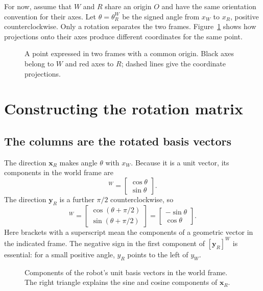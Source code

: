 For now, assume that $W$ and $R$ share an origin $O$ and have the same
orientation convention for their axes. Let $\theta=\theta_R^W$ be the signed
angle from $x_W$ to $x_R$, positive counterclockwise. Only a rotation separates
the two frames. Figure~\ref{fig:l02-coordinates} shows how projections onto
their axes produce different coordinates for the same point.

\begin{figure}[htbp]
\centering
\caption{A point expressed in two frames with a common origin. Black axes
belong to $W$ and red axes to $R$; dashed lines give the coordinate projections.}
\label{fig:l02-coordinates}
\end{figure}

\section{Constructing the rotation matrix}
\subsection{The columns are the rotated basis vectors}
The direction $\boldsymbol{x}_R$ makes angle $\theta$ with $x_W$. Because it
is a unit vector, its components in the world frame are
\begin{equation}
 [\boldsymbol{x}_R]^W=\begin{bmatrix}\cos\theta\\\sin\theta\end{bmatrix}.
\end{equation}
The direction $\boldsymbol{y}_R$ is a further $\pi/2$ counterclockwise, so
\begin{equation}
 [\boldsymbol{y}_R]^W
 =\begin{bmatrix}\cos(\theta+\pi/2)\\\sin(\theta+\pi/2)\end{bmatrix}
 =\begin{bmatrix}-\sin\theta\\\cos\theta\end{bmatrix}.
\end{equation}
Here brackets with a superscript mean the components of a geometric vector
in the indicated frame. The negative sign in the first component of
$[\boldsymbol{y}_R]^W$ is essential: for a small positive angle, $y_R$
points to the left of $y_W$.

\begin{figure}[htbp]
\centering
\caption{Components of the robot's unit basis vectors in the world frame.
The right triangle explains the sine and cosine components of $\boldsymbol{x}_R$.}
\label{fig:l02-basis}
\end{figure}

